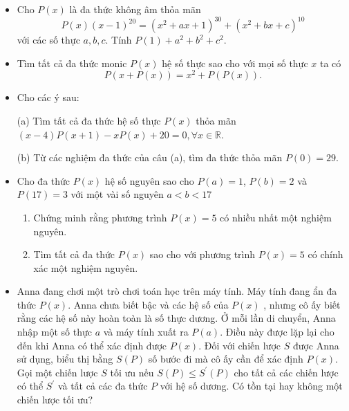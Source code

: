 \documentclass[11pt]{scrartcl}
\begin{document}
\begin{itemize}[label=, leftmargin=0em, itemsep=-0em]
        \item \begin{btvn}
            Cho $P(x)$ là đa thức không âm thỏa mãn
            $$
            P(x)(x-1)^{20}=\left(x^2+a x+1\right)^{30}+\left(x^2+b x+c\right)^{10}
            $$
            với các số thực $a, b, c$. Tính $P(1)+a^2+b^2+c^2$.
        \end{btvn}

        \item \begin{btvn}
            Tìm tất cả đa thức monic $P(x)$ hệ số thực sao cho với mọi số thực $x$ ta có
            $$
            P(x+P(x))=x^2+P(P(x)) .
            $$
        \end{btvn}

        \item \begin{btvn}
            Cho các ý sau:

            (a) Tìm tất cả đa thức hệ số thực $P(x)$ thỏa mãn $(x-4) P(x+1)-x P(x)+20=0, \forall x \in \mathbb{R}$.

            (b) Từ các nghiệm đa thức của câu (a), tìm đa thức thỏa mãn $P(0) = 29$.
        \end{btvn}

        \item \begin{btvn}
            Cho đa thức $P(x)$ hệ số nguyên sao cho $P(a) = 1$, $P(b) = 2$ và $P(17) = 3$ với một vài số nguyên $a < b < 17$
            \begin{enumerate}[label=(\alph*)]
                \item Chứng minh rằng phương trình $P(x) = 5$ có nhiều nhất một nghiệm nguyên.
                \item Tìm tất cả đa thức $P(x)$ sao cho với phương trình $P(x) = 5$ có chính xác một nghiệm nguyên.
            \end{enumerate}
        \end{btvn}

        \item \begin{btvn}
            Anna đang chơi một trò chơi toán học trên máy tính. Máy tính đang ẩn đa thức $P(x)$. Anna chưa biết bậc và các hệ số của $P(x)$ , nhưng cô ấy biết rằng các hệ số này hoàn toàn là số thực dương. Ở mỗi lần di chuyển, Anna nhập một số thực $a$ và máy tính xuất ra $P(a)$. Điều này được lặp lại cho đến khi Anna có thể xác định được $P(x)$. Đối với chiến lược $S$ được Anna sử dụng, biểu thị bằng $S(P)$ số bước đi mà cô ấy cần để xác định $P(x)$. Gọi một chiến lược $S$ tối ưu nếu $S(P) \leq S^{\prime}(P)$ cho tất cả các chiến lược có thể $S^{\prime}$ và tất cả các đa thức $P$ với hệ số dương. Có tồn tại hay không một chiến lược tối ưu?
        \end{btvn}


\end{itemize}
\end{document}
